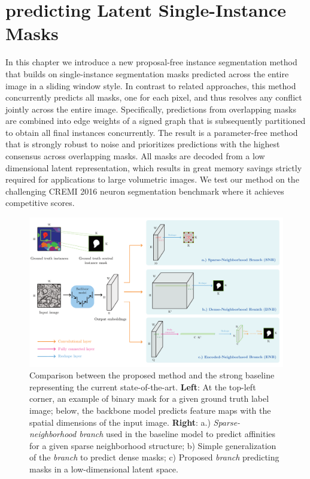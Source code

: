\chapter{predicting Latent Single-Instance Masks}\label{chapter:LSI}

In this chapter we introduce a new proposal-free instance segmentation method that builds on single-instance segmentation masks predicted across the entire image in a sliding window style.
In contrast to related approaches, this method concurrently predicts all masks, one for each pixel, and thus resolves any conflict jointly across the entire image.
Specifically, predictions from overlapping masks are combined into edge weights of a signed graph that is subsequently partitioned to obtain all final instances concurrently.
The result is a parameter-free method that is strongly robust to noise and prioritizes predictions with the highest consensus across overlapping masks. 
All masks are decoded from a low dimensional latent representation, which results in great memory savings strictly required for applications to large volumetric images. 
We test our method on the challenging CREMI 2016 neuron segmentation benchmark where it achieves competitive scores. 

\begin{figure}[t]
\centering
        \includegraphics[width=\textwidth]{./figures/LSIMasks/main_fig.pdf} %
        \caption{Comparison between the proposed method and the strong baseline representing the current state-of-the-art. \textbf{Left}: At the top-left corner, an example of binary \maskname mask for a given ground truth label image; below, the backbone model predicts feature maps with the spatial dimensions of the input image. \textbf{Right}: a.) \emph{Sparse-neighborhood branch} used in the baseline model to predict affinities for a given sparse neighborhood structure; b) Simple generalization of the \emph{\sparseBr branch} to predict dense \maskname masks; c) Proposed \emph{\encBr branch} predicting \maskname masks in a low-dimensional latent space.}
    \label{fig:main_figure}
\end{figure}




